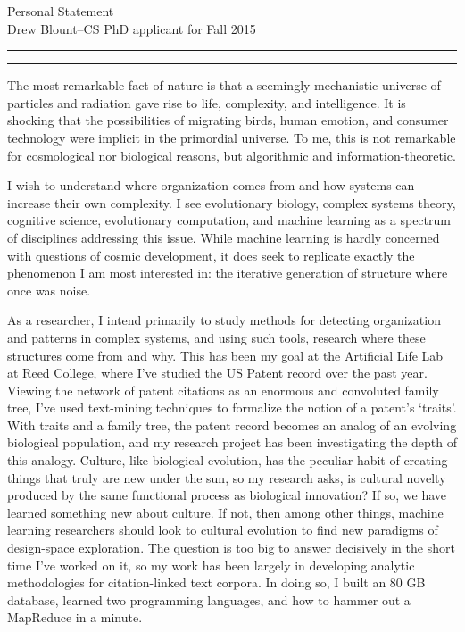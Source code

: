 \documentclass{article}
\newcommand{\soptitle}{Personal Statement}
\newcommand{\yourname}{Drew Blount}
\begin{document}
\begin{center}\LARGE\soptitle\\
\large \yourname\---CS PhD applicant for Fall 2015
\end{center}

\hrule
\vspace{1pt}
\hrule height 1pt

\bigskip


The most remarkable fact of nature is that a seemingly mechanistic universe of particles and radiation gave rise to life, complexity, and intelligence. It is shocking that the possibilities of migrating birds, human emotion, and consumer technology were implicit in the primordial universe. To me, this is not remarkable for cosmological nor biological reasons, but algorithmic and information-theoretic.

I wish to understand where organization comes from and how systems can increase their own complexity.
I see evolutionary biology, complex systems theory, cognitive science, evolutionary computation, 
and machine learning as a spectrum of disciplines addressing this issue. While machine learning
is hardly concerned with questions of cosmic development, it does seek to replicate
exactly the phenomenon I am most interested in: the iterative generation of structure where once was
noise.

As a researcher, I intend primarily to study methods for detecting organization and patterns
in complex systems, and using such tools, research where these structures come from and why.
This has been my goal at the Artificial Life Lab at Reed College, where I've studied the US Patent 
record over the past year. Viewing the network of patent citations as an enormous and convoluted
family tree, I've used  text-mining techniques to formalize the notion of a patent's `traits'. With 
traits and a family tree, the patent record becomes an analog of an evolving biological population, and my
research project has been investigating the depth of this analogy. Culture, like biological evolution, 
has the peculiar habit of creating things that truly are new under the sun, so my research asks, is cultural novelty produced by the same functional process as biological innovation? If so, we have learned something new about culture. If not, then among other things, machine learning researchers should look to cultural evolution to find new paradigms of design-space exploration. The question is too big to answer decisively in the short time I've worked on it, so my work has been largely in developing analytic methodologies for citation-linked text corpora. In doing so, I built an 80 GB database, learned two programming languages, and how to hammer out a MapReduce in a minute. 
\end{document}
